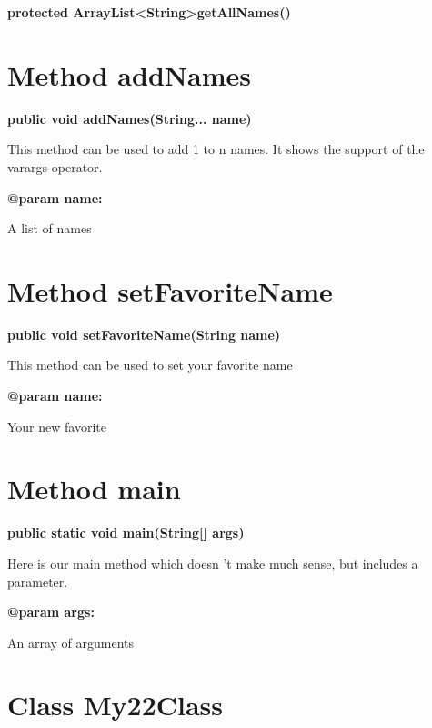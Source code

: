 \documentclass[12pt]{scrreprt}
\begin{document}
\textbf{protected ArrayList\textless String\textgreater  getAllNames()}








\section{Method addNames}
\label{examples.SimpleExample:addNames}




\textbf{public void addNames(String... name)}


This method can be used to add 1 to n names. It shows the support of the varargs operator.



\textbf{@param name:}

\quad\quad A list of names



\section{Method setFavoriteName}
\label{examples.SimpleExample:setFavoriteName}




\textbf{public void setFavoriteName(String name)}


This method can be used to set your favorite name



\textbf{@param name:}

\quad\quad Your new favorite



\section{Method main}
\label{examples.SimpleExample:main}




\textbf{public static void main(String[] args)}


Here is our main method which doesn 't make much sense, but includes a parameter.



\textbf{@param args:}

\quad\quad An array of arguments



\section{Class My22Class}
\label{examples.SimpleExample.My22Class}
\end{document}
